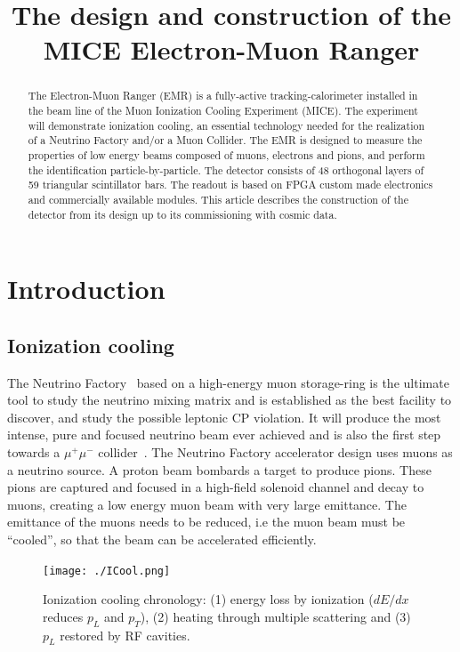 \documentclass[a4paper,11pt]{article}
\title{The design and construction of the MICE Electron-Muon Ranger}
\author{}
\begin{document}
\maketitle

\begin{abstract}
The Electron-Muon Ranger (EMR) is a fully-active tracking-calorimeter installed in the beam line of the Muon Ionization
Cooling Experiment (MICE). The experiment will demonstrate ionization cooling, an essential technology needed
for the realization of a Neutrino Factory and/or a Muon Collider. The EMR is designed to measure the properties of low
energy beams composed of muons, electrons and pions, and perform the identification particle-by-particle. The detector consists of 48 orthogonal layers of 59 triangular scintillator
bars. The readout is based on FPGA custom made electronics and commercially available modules. This article describes
the construction of the detector from its design up to its commissioning with cosmic data.
\end{abstract}

\section{Introduction}
\subsection{Ionization cooling}
The Neutrino Factory~\cite{NFReference, nf} based on a high-energy muon storage-ring is the ultimate tool to study the neutrino mixing matrix
and is established as the best facility to discover, and study the possible leptonic CP violation. It will produce the
most intense, pure and focused neutrino beam ever achieved and is also the first step towards a $\mu^+ \mu^-$ collider~\cite{Neuffer:multitev, Palmer:1996gs}.
The Neutrino Factory accelerator design uses muons as a neutrino source. A proton beam bombards
a target to produce pions. These pions are captured and focused in a high-field solenoid channel and decay
to muons, creating a low energy muon beam with very large emittance.  The emittance of the muons needs to be reduced,
i.e the muon beam must be “cooled”, so that the beam can be accelerated efficiently.

\begin{figure}[htb]
 \texttt{[image: ./ICool.png]}
 \caption{Ionization cooling chronology: (1) energy loss by ionization ($dE/dx$ reduces $p_L$ and $p_T$),
    (2) heating through multiple scattering and
    (3) $p_L$ restored by RF cavities.
   }
 \label{fig:icool}     
\end{figure}
\end{document}
